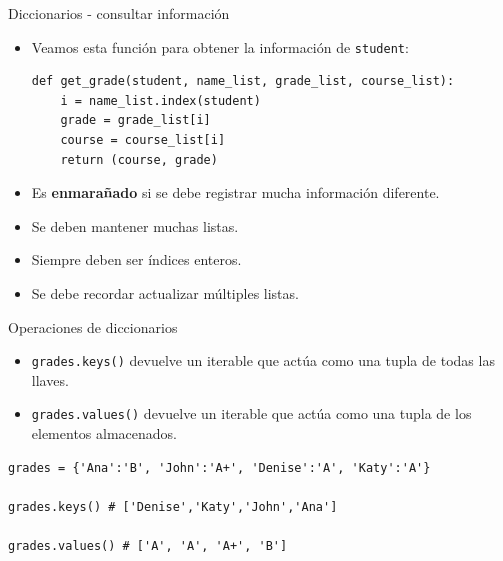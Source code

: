 \documentclass[mathserif]{beamer}
\begin{document}
\begin{frame}[fragile]{Diccionarios - consultar información}
    \begin{itemize}
        \item Veamos esta función para obtener la información de \lstinline|student|:
\begin{lstlisting}
def get_grade(student, name_list, grade_list, course_list): 
    i = name_list.index(student)
    grade = grade_list[i]
    course = course_list[i]
    return (course, grade)
\end{lstlisting}

        \item Es {\blue\bfseries enmarañado} si se debe registrar mucha información diferente.
        
        \item Se deben mantener muchas listas.
        \item Siempre deben ser índices {\blue enteros}.
        \item Se debe recordar actualizar múltiples listas.
    \end{itemize}
\end{frame}


\begin{frame}[fragile]{Operaciones de diccionarios}
    \begin{itemize}
        \item \lstinline|grades.keys()| devuelve un iterable que actúa como una tupla de todas las llaves.
        \item \lstinline|grades.values()| devuelve un iterable que actúa como una tupla de los elementos almacenados.
    \end{itemize}
\begin{lstlisting}
grades = {'Ana':'B', 'John':'A+', 'Denise':'A', 'Katy':'A'}

grades.keys() # ['Denise','Katy','John','Ana']

grades.values() # ['A', 'A', 'A+', 'B']
\end{lstlisting}

\end{frame}
\end{document}
